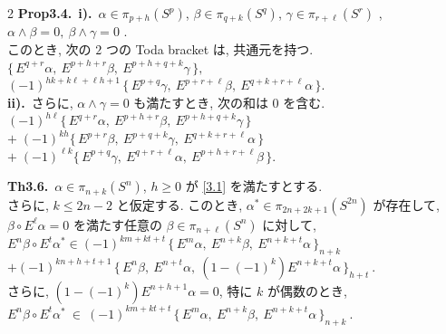 \documentclass[10pt, leqno]{ltjsarticle}
\newcommand{\Ex}{E}        %
\newcommand{\toda}[1]{\{\,#1\,\}}              %
\newcommand{\todai}[2][]{\{\,#2\,\}_{#1}}      %
\newcommand{\pis}[2]{\pi_{#1}(#2)}       %
\numberwithin{equation}{section}
\theoremstyle{plain}
\theoremstyle{definition}
\theoremstyle{remark}
\begin{document}
\begin{paracol}{2}
\noindent
\textbf{Prop3.4.}\
\textbf{i).}\
$\alpha\in\pi_{p+h}(S^p)$, 
$\beta\in\pi_{q+k}(S^q)$, 
$\gamma\in\pi_{r+\ell}(S^r)$ ,
\(\alpha \wedge \beta = 0,\ \beta \wedge \gamma = 0\)
. \\
このとき, 次の $2$ つの Toda bracket は, 共通元を持つ.\\
\(
\toda{E^{q+r}\alpha,\ E^{p+h+r}\beta,\ E^{p+h+q+k}\gamma}, 
\)
\(
(-1)^{hk+k\ell+\ell h+1}\,\toda{E^{p+q}\gamma,\ E^{p+r+\ell}\beta,\ 
E^{q+k+r+\ell}\alpha}.
\)\\
\textbf{ii).}\
さらに, $\alpha \wedge \gamma=0$ も満たすとき, 次の和は \(0\) を含む. \\
\(
(-1)^{h\ell} \toda{E^{q+r}\alpha,\ E^{p+h+r}\beta,\ E^{p+h+q+k}\gamma}
\)
\(+\;(-1)^{kh}\toda{E^{p+r}\beta,\ E^{p+q+k}\gamma,\ E^{q+k+r+\ell}\alpha}
\)\\
\(+\;(-1)^{\ell k}\toda{E^{p+q}\gamma,\ E^{q+r+\ell}\alpha,\ E^{p+h+r+\ell}\beta} .
\)

\noindent
\textbf{Th3.6.}\
$\alpha\in\pis{n+k}{S^{n}}$, $h\ge0$ が \eqref{3.1} を満たすとする.\\ 
さらに, $k\le 2n-2$ と仮定する.
このとき,
\(\alpha^{*}\in\pis{2n+2k+1}{S^{2n}}\)
が存在して, \\
\(\beta\circ \Ex^{\ell}\alpha=0\)
を満たす任意の $\beta\in\pis{n+\ell}{S^{n}}$ に対して, \\
\(\Ex^{n}\beta \circ \Ex^{t}\alpha^{*}
\in (-1)^{km+kt+t}\,\todai[n+k]{\Ex^{m}\alpha,\ 
  \Ex^{n+k}\beta,\ \Ex^{n+k+t}\alpha}\)\\
\(+ (-1)^{kn+h+t+1}\,\todai[h+t]{\Ex^{n}\beta,\ 
  \Ex^{n+t}\alpha,\ (1-(-1)^k)\Ex^{n+k+t}\alpha}\ .\)\\
さらに,
\((1-(-1)^k)\Ex^{n+h+1}\alpha=0\), 特に \(k\) が偶数のとき, \\
\(
\Ex^{n}\beta\circ \Ex^{t}\alpha^{*}\ \in\
(-1)^{km+kt+t}\,\todai[n+k]{\Ex^{m}\alpha,\ \Ex^{n+k}\beta,\ \Ex^{n+k+t}\alpha}\ .
\)



\end{paracol}

\newpage
\end{document}
